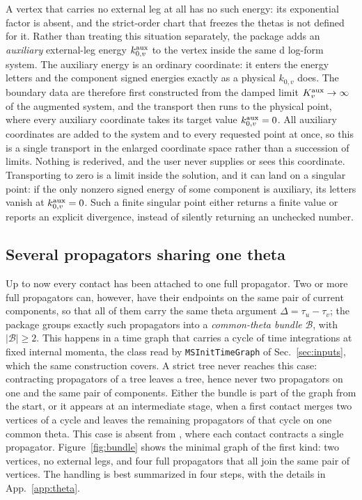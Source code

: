\documentclass[11pt,a4paper]{article}
\newcommand{\cB}{\mathcal B}
\begin{document}
A vertex that carries no external leg at all has no
such energy: its exponential factor is absent, and the strict-order chart that freezes the thetas is
not defined for it. Rather than treating this situation separately, the package adds an
\emph{auxiliary} external-leg energy $k_{0,v}^{\rm aux}$ to the vertex inside the same d log-form
system. The auxiliary energy is an ordinary coordinate: it enters the energy letters and the
component signed energies exactly as a physical $k_{0,v}$ does. The boundary data are therefore first
constructed from the damped limit $K_v^{\rm aux}\to\infty$ of the augmented system, and the transport
then runs to the physical point, where every auxiliary coordinate takes its target value
$k_{0,v}^{\rm aux}=0$. All auxiliary coordinates are added to the system and to every requested
point at once, so this is a single transport in the enlarged coordinate space rather than a
succession of limits. Nothing is rederived, and the user never supplies or sees this
coordinate. Transporting to zero is a limit inside the solution, and it can land on a singular
point: if the only nonzero signed energy of some component is auxiliary, its letters vanish at
$k_{0,v}^{\rm aux}=0$. Such a finite singular point either returns a finite value or reports an
explicit divergence, instead of silently returning an unchecked number.

\subsection{Several propagators sharing one theta}
\label{sec:common-theta}

Up to now every contact has been attached to one full propagator. Two or more full propagators can,
however, have their endpoints on the same pair of current components, so that all of them carry the same
theta argument $\Delta=\tau_u-\tau_v$; the package groups exactly such propagators into a
\emph{common-theta bundle} $\cB$, with $|\cB|\ge2$. This happens in a time graph that carries a cycle of
time integrations at fixed internal momenta, the class read by \texttt{MSInitTimeGraph} of
Sec.~\ref{sec:inputs}, which the same construction covers. A strict tree never reaches this case:
contracting propagators of a tree leaves a tree, hence never two propagators on one and the same pair of
components. Either the bundle is part of the graph from the start, or it appears at an intermediate
stage, when a first contact merges two vertices of a cycle and leaves the remaining propagators of that
cycle on one common theta. This case is absent from
\cite{Chen:2023iix}, where each contact contracts a single propagator.
Figure~\ref{fig:bundle} shows the minimal graph of the first kind: two vertices, no external legs, and four
full propagators that all join the same pair of vertices. The handling is best
summarized in four steps, with the details in App.~\ref{app:theta}.
\end{document}
